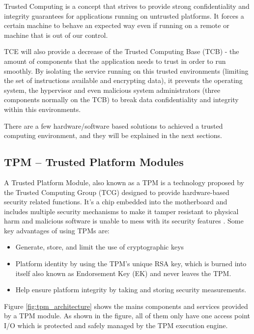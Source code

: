 Trusted Computing is a concept that strives to provide strong confidentiality and integrity guarantees for applications running on untrusted platforms. It forces a certain machine to behave an expected way even if running on a remote or machine that is out of our control.

\gls{TCE} will also provide a decrease of the Trusted Computing Base (\gls{TCB}) - the amount of components that the application needs to trust in order to run smoothly. By isolating the service running on this trusted environments (limiting the set of instructions available and encrypting data), it prevents the operating system, the hypervisor and even malicious system administrators (three components normally on the \gls{TCB}) to break data confidentiality and integrity within this environments.

There are a few hardware/software based solutions to achieved a trusted computing environment, and they will be explained in the next sections.

\subsection{TPM – Trusted Platform Modules } %
\label{ssec:trusted_platform_modules}

A Trusted Platform Module, also known as a \gls{TPM} is a technology proposed by the Trusted Computing Group (\gls{TCG}) designed to provide hardware-based security related functions. It's a chip embedded into the motherboard and includes multiple security mechanisms to make it tamper resistant to physical harm and malicious software is unable to mess with its security features \cite{tpm:1}. Some key advantages of using \glspl{TPM} are:

\begin{itemize}
	\item Generate, store, and limit the use of cryptographic keys
	\item Platform identity by using the TPM’s unique RSA key, which is burned into itself also known as Endorsement Key (\gls{EK}) and never leaves the \gls{TPM}.
	\item Help ensure platform integrity by taking and storing security measurements.
\end{itemize}

Figure \ref{fig:tpm_architecture} shows the mains components and services provided by a \gls{TPM} module. As shown in the figure, all of them only have one access point \gls{I/O} which is protected and safely managed by the \gls{TPM} execution engine.

